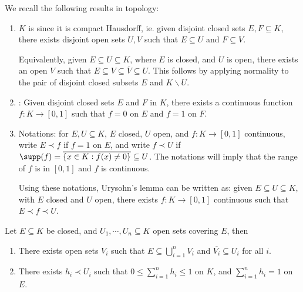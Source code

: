 \documentclass[a4paper]{article}
\begin{document}
We recall the following results in topology:
\begin{enumerate}
	\item $K$ is  since it is compact Hausdorff, ie. given disjoint closed sets $E,F\subseteq K$, there exists disjoint open sets $U,V$ such that $E\subseteq U$ and $F\subseteq V$.

	Equivalently, given $E\subseteq U\subseteq K$, where $E$ is closed, and $U$ is open, there exists an open $V$ such that $E\subseteq V\subseteq\overline{V}\subseteq U$. This follows by applying normality to the pair of disjoint closed subsets $E$ and $K\backslash U$.
	\item {}: Given disjoint closed sets $E$ and $F$ in $K$, there exists a continuous function $f:K\to[0,1]$ such that $f=0$ on $E$ and $f=1$ on $F$.
	\item Notations: for $E,U\subseteq K$, $E$ closed, $U$ open, and $f:K\to [0,1]$ continuous, write $E\prec f$ if $f=1$ on $E$, and write $f\prec U$ if $\supp(f)=\overline{\{x\in K:f(x)\not= 0\}}\subseteq U$. The notations will imply that the range of $f$ is in $[0,1]$ and $f$ is continuous.

	 Using these notations, Urysohn's lemma can be written as: given $E\subseteq U\subseteq K$, with $E$ closed and $U$ open, there exists $f:K\to[0,1]$ continuous such that $E\prec f\prec U$.
\end{enumerate}

\begin{nlemma}\label{lem:PartitionUnity}
	Let $E\subseteq K$ be closed, and $U_1,\cdots,U_n\subseteq K$ open sets covering $E$, then
	\begin{enumerate}[label=(\roman*)]
		\item There exists open sets $V_i$ such that $E\subseteq\bigcup_{i=1}^n V_i$ and $\overline{V_i}\subseteq U_i$ for all $i$.
		\item There exists $h_i\prec U_i$ such that $0\leq\sum_{i=1}^n h_i\leq 1$ on $K$, and $\sum_{i=1}^n h_i=1$ on $E$.
	\end{enumerate}
\end{nlemma}
\end{document}
